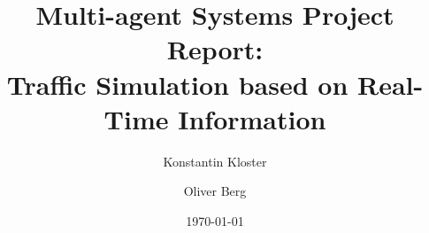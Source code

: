 \documentclass[10pt, oneside]{article}
\title{Multi-agent Systems Project Report: \\
    Traffic Simulation based on Real-Time Information}
\author[]{Konstantin Kloster}
\author[]{Oliver Berg}
\affil[1]{Technical University Kaiserslautern}
\date{\today}
\begin{document}
\maketitle



\begin{abstract}
    \lipsum[1]
    \lipsum[2]
\end{abstract}

\tableofcontents

\newpage
\newpage
\newpage
\newpage
\newpage
\newpage



\newpage



\end{document}

